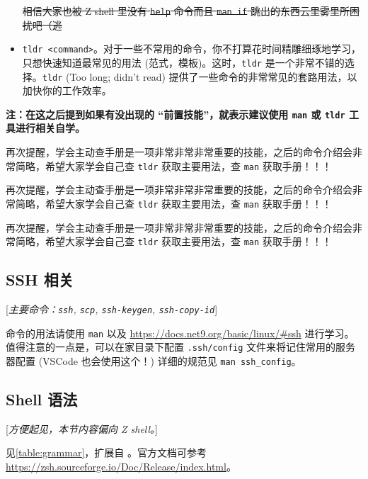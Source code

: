 \documentclass{article}
\begin{document}
\begin{itemize}
			\normalcolor\sout{相信大家也被 Z shell 里没有 \texttt{help} 命令而且 \texttt{man if} 跳出的东西云里雾里所困扰吧（逃}
		\item \texttt{tldr <command>}。对于一些不常用的命令，你不打算花时间精雕细琢地学习，只想快速知道最常见的用法 (范式，模板)。这时，\texttt{tldr} 是一个非常不错的选择。\texttt{tldr} (Too long; didn't read) 提供了一些命令的非常常见的套路用法，以加快你的工作效率。
	\end{itemize}

	{\color{red}\bfseries 注：在这之后提到如果有没出现的 ``前置技能''，就表示建议使用 \texttt{man} 或 \texttt{tldr} 工具进行相关自学。\par
	再次提醒，学会主动查手册是一项非常非常非常重要的技能，之后的命令介绍会非常简略，希望大家学会自己查 \texttt{tldr} 获取主要用法，查 \texttt{man} 获取手册！！！\par
	再次提醒，学会主动查手册是一项非常非常非常重要的技能，之后的命令介绍会非常简略，希望大家学会自己查 \texttt{tldr} 获取主要用法，查 \texttt{man} 获取手册！！！\par
	再次提醒，学会主动查手册是一项非常非常非常重要的技能，之后的命令介绍会非常简略，希望大家学会自己查 \texttt{tldr} 获取主要用法，查 \texttt{man} 获取手册！！！}

	\subsection{SSH 相关}

	\textcolor{properpurple}{[\textit{主要命令：\texttt{ssh}, \texttt{scp}, \texttt{ssh-keygen}, \texttt{ssh-copy-id}}]}

	命令的用法请使用 \texttt{man} 以及 \url{https://docs.net9.org/basic/linux/#ssh} 进行学习。值得注意的一点是，可以在家目录下配置 \texttt{.ssh/config} 文件来将记住常用的服务器配置 (VSCode 也会使用这个！) 详细的规范见 \verb!man ssh_config!。

	\subsection{Shell 语法}
	\label{sss:shell-syntax}

	\textcolor{properpurple}{[\textit{方便起见，本节内容偏向 Z shell。}]}

	见\autoref{table:grammar}，扩展自 \cite{lbwvssl}。官方文档可参考 \url{https://zsh.sourceforge.io/Doc/Release/index.html}。
\end{document}
